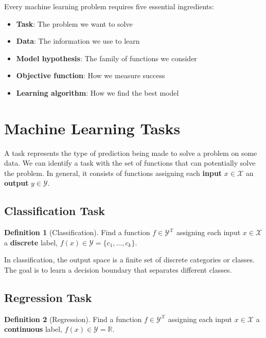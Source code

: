 \documentclass[11pt,a4paper]{article}
\theoremstyle{definition}
\newtheorem{definition}{Definition}[section]
\theoremstyle{plain}
\theoremstyle{remark}
\begin{document}
Every machine learning problem requires five essential ingredients:
\begin{itemize}
    \item \textbf{Task}: The problem we want to solve
    \item \textbf{Data}: The information we use to learn
    \item \textbf{Model hypothesis}: The family of functions we consider
    \item \textbf{Objective function}: How we measure success
    \item \textbf{Learning algorithm}: How we find the best model
\end{itemize}

\section{Machine Learning Tasks}

A task represents the type of prediction being made to solve a problem on some data. We can identify a task with the set of functions that can potentially solve the problem. In general, it consists of functions assigning each \textbf{input} $x \in \mathcal{X}$ an \textbf{output} $y \in \mathcal{Y}$.

\subsection{Classification Task}

\begin{definition}[Classification]
Find a function $f \in \mathcal{Y}^{\mathcal{X}}$ assigning each input $x \in \mathcal{X}$ a \textbf{discrete} label, $f(x) \in \mathcal{Y} = \{c_1, \ldots, c_k\}$.
\end{definition}

In classification, the output space is a finite set of discrete categories or classes. The goal is to learn a decision boundary that separates different classes.

\subsection{Regression Task}

\begin{definition}[Regression]
Find a function $f \in \mathcal{Y}^{\mathcal{X}}$ assigning each input $x \in \mathcal{X}$ a \textbf{continuous} label, $f(x) \in \mathcal{Y} = \mathbb{R}$.
\end{definition}
\end{document}
